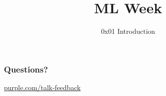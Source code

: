 
\title
{ML Week}
\subtitle{0x01 \hspace{2mm}  Introduction}




\begin{frame}
  \titlepage
\end{frame}


\begin{frame}
  \phrase{}
\end{frame}

\begin{frame}
  \frametitle{}
  \begin{mphrase}
    
  \end{mphrase}
\end{frame}



\begin{frame}
  \frametitle{Questions?}
  \centerline{\large\url{purple.com/talk-feedback}}
\end{frame}


